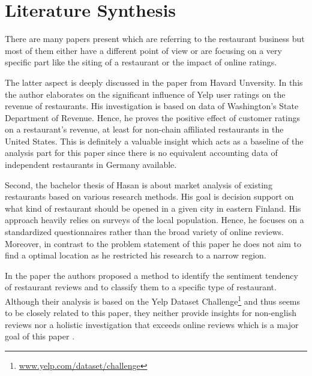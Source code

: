 \section{Literature Synthesis}
\label{sec:synthesis}
There are many papers present which are referring to the restaurant business but most of them either have a different point of view or are focusing on a very specific part like the siting of a restaurant or the impact of online ratings.

The latter aspect is deeply discussed in the paper from Havard Unversity\cite{CaseOfYelp}. In this the author elaborates on the significant influence of Yelp user ratings on the revenue of restaurants. His investigation is based on data of Washington’s State Department of Revenue. Hence, he proves the positive effect of customer ratings on a restaurant's revenue, at least for non-chain affiliated restaurants in the United States. This is definitely a valuable insight which acts as a baseline of the analysis part for this paper since there is no equivalent accounting data of independent restaurants in Germany available. 

Second, the bachelor thesis of Hasan\cite{Imatra} is about market analysis of existing restaurants based on various research methods. His goal is decision support on what kind of restaurant should be opened in a given city in eastern Finland. His approach heavily relies on surveys of the local population. Hence, he focuses on a standardized questionnaires rather than the broad variety of online reviews. Moreover, in contrast to the problem statement of this paper he does not aim to find a optimal location as he restricted his research to a narrow region. 

In the paper \cite{SentimentAnalysis} the authors proposed a method to identify the sentiment tendency of restaurant reviews and to classify them to a specific type of restaurant. Although their analysis is based on the Yelp Dataset Challenge\footnote{\href{https://www.yelp.com/dataset/challenge}{www.yelp.com/dataset/challenge}} and thus seems to be closely related to this paper, they neither provide insights for non-english reviews nor a holistic investigation that exceeds online reviews which is a major goal of this paper .
